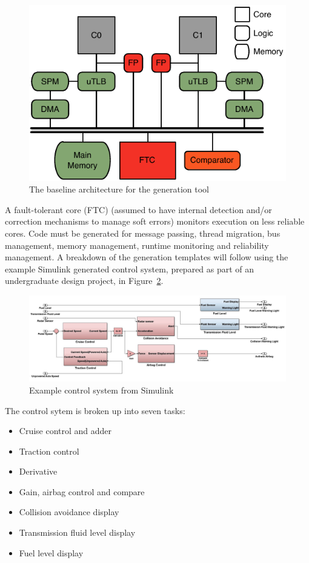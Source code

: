 \documentclass[table,11pt]{article}
\begin{document}
\begin{figure}[h]
\centering
\includegraphics{figures/architecture.pdf}
\caption{The baseline architecture for the generation tool}
\label{f:nios-arch}
\end{figure}

A fault-tolerant core (FTC) (assumed to have internal detection and/or correction mechanisms to manage soft errors) monitors execution on less reliable cores. Code must be generated for message passing, thread migration, bus management, memory management, runtime monitoring and reliability management. A breakdown of the generation templates will follow using the example Simulink generated control system, prepared as part of an undergraduate design project, in Figure~\ref{f:simulink}.

\begin{figure}[h]
\centering
\includegraphics[scale=0.32]{figures/matlab-ctrl.jpg}
\caption{Example control system from Simulink}
\label{f:simulink}
\end{figure}

The control sytem is broken up into seven tasks:

\begin{itemize}
  \item Cruise control and adder
  \item Traction control
  \item Derivative
  \item Gain, airbag control and compare
  \item Collision avoidance display
  \item Transmission fluid level display
  \item Fuel level display
\end{itemize}
\end{document}
